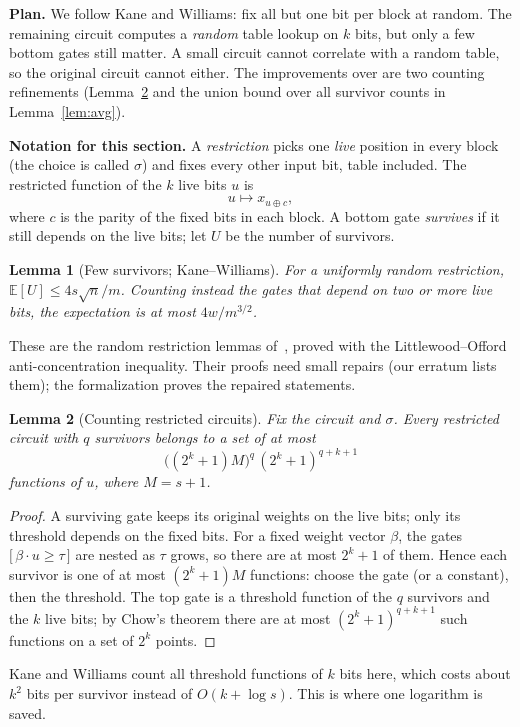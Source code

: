 \documentclass[11pt,letterpaper]{article}
\newtheorem{lemma}{Lemma}
\newcommand{\ind}[1]{\bigl[\,#1\,\bigr]}
\newcommand{\smalltitle}[1]{\textbf{\color{ink}#1}\quad}
\begin{document}
\smalltitle{Plan.}
We follow Kane and Williams: fix all but one bit per block at random. The
remaining circuit computes a \emph{random} table lookup on $k$ bits, but
only a few bottom gates still matter. A small circuit cannot correlate with a
random table, so the original circuit cannot either. The improvements over
\cite{KW} are two counting refinements (Lemma~\ref{lem:count} and the
union bound over all survivor counts in Lemma~\ref{lem:avg}).

\begin{keybox}
\textbf{Notation for this section.}
A \emph{restriction} picks one \emph{live} position in every block (the
choice is called $\sigma$) and fixes every other input bit, table included.
The restricted function of the $k$ live bits $u$ is
\[
u\mapsto x_{u\oplus c},
\]
where $c$ is the parity of the fixed bits in each block. A bottom gate
\emph{survives} if it still depends on the live bits; let $U$ be the number
of survivors.
\end{keybox}

\begin{lemma}[Few survivors; Kane--Williams]\label{lem:surv}
For a uniformly random restriction,
$\mathbb E[U]\le 4s\sqrt n/m$. Counting instead the gates that depend on two
or more live bits, the expectation is at most $4w/m^{3/2}$.
\end{lemma}
These are the random restriction lemmas of~\cite[Section~3]{KW}, proved with the Littlewood--Offord
anti-concentration inequality. Their proofs need small repairs (our erratum
lists them); the formalization proves the repaired statements.

\begin{lemma}[Counting restricted circuits]\label{lem:count}
Fix the circuit and $\sigma$. Every restricted circuit with $q$ survivors
belongs to a set of at most
\[
\bigl((2^k+1)M\bigr)^q\,(2^k+1)^{q+k+1}
\]
functions of $u$, where $M=s+1$.
\end{lemma}
\begin{proof}
A surviving gate keeps its original weights on the live bits; only its
threshold depends on the fixed bits. For a fixed weight vector $\beta$, the
gates $\ind{\beta\cdot u\ge\tau}$ are nested as $\tau$ grows, so there are at
most $2^k+1$ of them. Hence each survivor is one of at most $(2^k+1)M$
functions: choose the gate (or a constant), then the threshold. The top gate
is a threshold function of the $q$ survivors and the $k$ live bits; by Chow's
theorem there are at most $(2^k+1)^{q+k+1}$ such functions on a set of $2^k$
points.
\end{proof}
Kane and Williams count all threshold functions of $k$ bits here, which costs
about $k^2$ bits per survivor instead of $O(k+\log s)$. This is where one
logarithm is saved.
\end{document}
